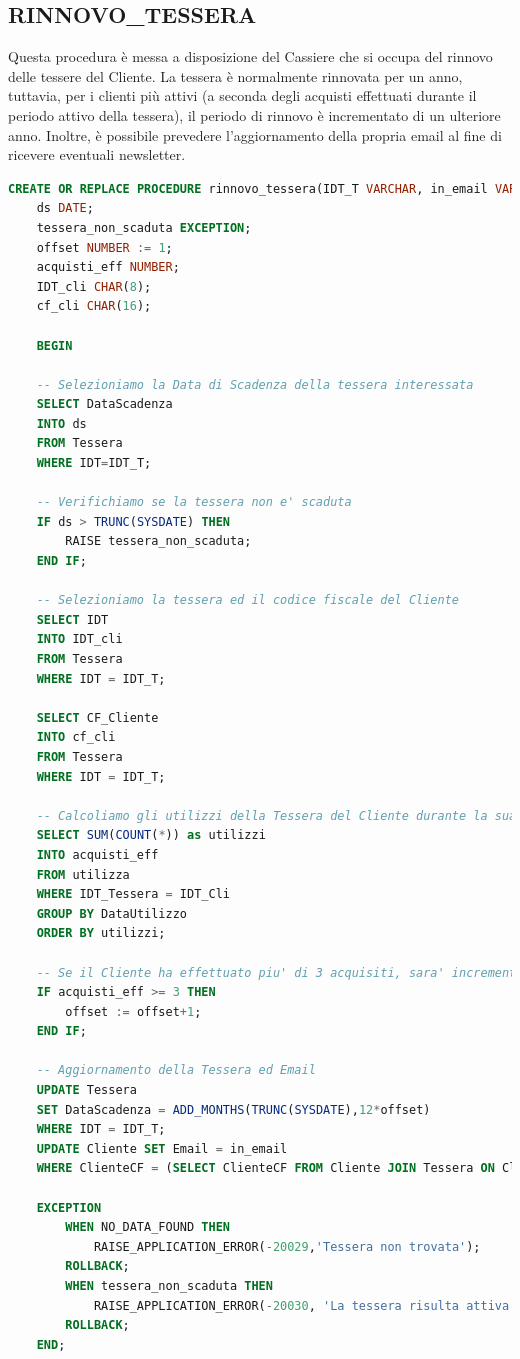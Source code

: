 \documentclass[12pt]{report}
\begin{document}
\subsection*{RINNOVO\_TESSERA}
Questa procedura è messa a disposizione del Cassiere che si occupa del rinnovo delle tessere del Cliente. La tessera è normalmente rinnovata per un anno, tuttavia, per i clienti più attivi (a seconda degli acquisti effettuati durante il periodo attivo della tessera), il periodo di rinnovo è incrementato di un ulteriore anno. Inoltre, è possibile prevedere l'aggiornamento della propria email al fine di ricevere eventuali newsletter. 
\begin{lstlisting}[language=SQL,caption={RINNOVO\_TESSERA}]
    CREATE OR REPLACE PROCEDURE rinnovo_tessera(IDT_T VARCHAR, in_email VARCHAR) IS
    ds DATE;
    tessera_non_scaduta EXCEPTION;
    offset NUMBER := 1;
    acquisti_eff NUMBER;
    IDT_cli CHAR(8);
    cf_cli CHAR(16);
    
    BEGIN
    
    -- Selezioniamo la Data di Scadenza della tessera interessata
    SELECT DataScadenza
    INTO ds
    FROM Tessera
    WHERE IDT=IDT_T;
    
    -- Verifichiamo se la tessera non e' scaduta
    IF ds > TRUNC(SYSDATE) THEN
        RAISE tessera_non_scaduta;
    END IF;
    
    -- Selezioniamo la tessera ed il codice fiscale del Cliente
    SELECT IDT
    INTO IDT_cli
    FROM Tessera
    WHERE IDT = IDT_T;
    
    SELECT CF_Cliente
    INTO cf_cli
    FROM Tessera
    WHERE IDT = IDT_T;

    -- Calcoliamo gli utilizzi della Tessera del Cliente durante la sua attivazione
    SELECT SUM(COUNT(*)) as utilizzi
    INTO acquisti_eff
    FROM utilizza
    WHERE IDT_Tessera = IDT_Cli
    GROUP BY DataUtilizzo
    ORDER BY utilizzi;
    
    -- Se il Cliente ha effettuato piu' di 3 acquisiti, sara' incrementata di 1 anno la sua scadenza
    IF acquisti_eff >= 3 THEN
        offset := offset+1; 
    END IF;
    
    -- Aggiornamento della Tessera ed Email
    UPDATE Tessera
    SET DataScadenza = ADD_MONTHS(TRUNC(SYSDATE),12*offset)
    WHERE IDT = IDT_T;
    UPDATE Cliente SET Email = in_email
    WHERE ClienteCF = (SELECT ClienteCF FROM Cliente JOIN Tessera ON Cliente.ClienteCF = Tessera.CF_Cliente WHERE ClienteCF = cf_cli);
    
    EXCEPTION
        WHEN NO_DATA_FOUND THEN
            RAISE_APPLICATION_ERROR(-20029,'Tessera non trovata');
        ROLLBACK;
        WHEN tessera_non_scaduta THEN
            RAISE_APPLICATION_ERROR(-20030, 'La tessera risulta attiva.');
        ROLLBACK;
    END;
\end{lstlisting}
\end{document}
